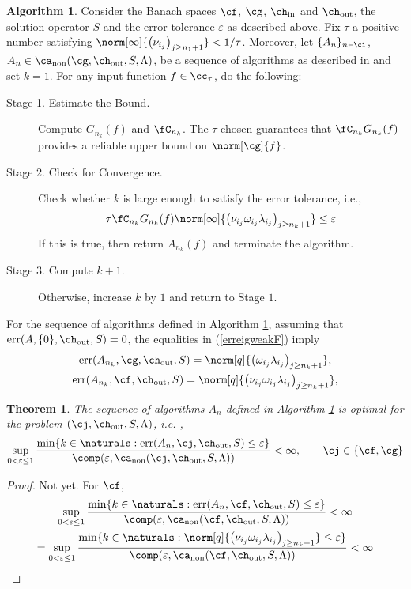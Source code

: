 \documentclass[final]{elsarticle}
\newcommand{\chin}{\ch_{\text{\rm{in}}}}
\newcommand{\chout}{\ch_{\text{\rm{out}}}}
\DeclareMathOperator{\err}{err}
\DeclareMathOperator{\non}{non}
\newtheorem{theorem}{Theorem}
\theoremstyle{definition}
\newtheorem{algo}{Algorithm}
\theoremstyle{remark}
\begin{document}
\begin{algo}\label{algo1}
 Consider the Banach spaces $\cf$, $\cg$, $\chin$ and $\chout$, the solution operator $S$ and the error tolerance $\varepsilon$ as described above. Fix $\tau$ a positive number satisfying $\norm[\infty]{\left(\nu_{i_j} \right)_{j\ge n_1+1}} < 1/\tau$. Moreover, let $\{A_n\}_{n\in\ci}$, $A_n\in\ca_{\non}(\cg,\chout,S,\Lambda)$, be a sequence of algorithms as described in \cite{HicEtal14b} and set $k=1$. For any input function $f\in\cc_\tau$, do the following:
\begin{description}
\item[Stage 1. Estimate the Bound.] Compute $G_{n_k}(f)$ and $\fC_{n_k}$. The $\tau$ chosen guarantees that $\fC_{n_k}G_{n_k}(f)$ provides a reliable upper bound on $\norm[\cg]{f}$.
\item[Stage 2. Check for Convergence.] Check whether $k$ is large enough to satisfy the error tolerance, i.e.,
    \begin{equation}
          \tau \fC_{n_k} G_{n_k}(f) \norm[\infty]{\left(\nu_{i_j} \omega_{i_j} \lambda_{i_j} \right)_{j\ge n_k+1}} \le \varepsilon
    \end{equation}
    If this is true, then return $A_{n_k}(f)$ and terminate the algorithm.
\item[Stage 3. Compute $k+1$.] Otherwise, increase $k$ by $1$ and return to Stage $1$.
\end{description}
\end{algo}

For the sequence of algorithms defined in Algorithm \ref{algo1}, assuming that $\err(A,\{0\},\chout,S)=0$, the equalities in (\ref{erreigweakF}) imply
\begin{gather}
\err(A_{n_k},\cg,\chout,S) = \norm[q]{\left(\omega_{i_j} \lambda_{i_j} \right)_{j\ge n_k+1}},\\
\err(A_{n_k},\cf,\chout,S) = \norm[q]{\left(\nu_{i_j} \omega_{i_j} \lambda_{i_j} \right)_{j\ge n_k+1}},
\end{gather}

\begin{theorem}\label{algo1opt}
The sequence of algorithms $A_n$ defined in Algorithm \ref{algo1} is \textit{optimal} for the problem $(\cj,\chout,S,\Lambda)$, i.e. ,
\begin{equation*}
\sup_{0 < \varepsilon \le 1}\frac{\min\{k\in\naturals:\err(A_n,\cj,\chout,S)\le\varepsilon\}} {\comp(\varepsilon,\ca_{\non}(\cj,\chout,S,\Lambda))} <\infty, \qquad \cj \in \{\cf,\cg\}
\end{equation*}
\end{theorem}
\begin{proof}
Not yet. For $\cf$,
\begin{gather}
\sup_{0 < \varepsilon \le 1}\frac{\min\{k\in\naturals:\err(A_n,\cf,\chout,S)\le\varepsilon\}} {\comp(\varepsilon,\ca_{\non}(\cf,\chout,S,\Lambda))} <\infty\\
=\sup_{0 < \varepsilon \le 1}\frac{\min\{k\in\naturals:\norm[q]{\left(\nu_{i_j} \omega_{i_j} \lambda_{i_j} \right)_{j\ge n_k+1}}\le\varepsilon\}} {\comp(\varepsilon,\ca_{\non}(\cf,\chout,S,\Lambda))} <\infty
\end{gather}
\end{proof}
\end{document}

